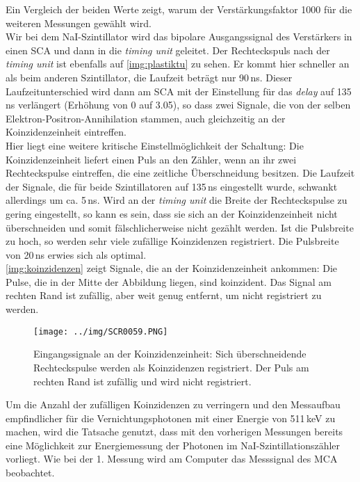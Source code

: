 Ein Vergleich der beiden Werte zeigt, warum der Verstärkungsfaktor 1000 für die weiteren Messungen gewählt wird.\\[\baselineskip]
Wir bei dem NaI-Szintillator wird das bipolare Ausgangssignal des Verstärkers in einen SCA
und dann in die \emph{timing unit} geleitet.
Der Rechteckspuls nach der \emph{timing unit} ist ebenfalls auf \autoref{img:plastiktu} zu sehen.
Er kommt hier schneller an als beim anderen Szintillator, 
die Laufzeit beträgt nur 90\,ns. Dieser Laufzeitunterschied wird dann am SCA mit der
Einstellung für das \emph{delay} auf 135\,ns verlängert (Erhöhung von 0 auf 3.05),
so dass zwei Signale, die von der selben
Elektron-Positron-Annihilation stammen, auch gleichzeitig an der Koinzidenzeinheit eintreffen.\\
Hier liegt eine weitere kritische Einstellmöglichkeit der Schaltung:
Die Koinzidenzeinheit liefert einen Puls an den Zähler, wenn an ihr zwei Rechteckspulse eintreffen,
die eine zeitliche Überschneidung besitzen.
Die Laufzeit der Signale, die für beide Szintillatoren auf 135\,ns eingestellt wurde,
schwankt allerdings um ca. 5\,ns. Wird an der \emph{timing unit}
die Breite der Rechteckspulse zu gering eingestellt, so
kann es sein, dass sie sich an der Koinzidenzeinheit nicht überschneiden und somit fälschlicherweise nicht
gezählt werden. Ist die Pulsbreite zu hoch, so werden sehr viele zufällige Koinzidenzen registriert.
Die Pulsbreite von 20\,ns erwies sich als optimal.\\
\autoref{img:koinzidenzen} zeigt Signale, die an der Koinzidenzeinheit ankommen:
Die Pulse, die in der Mitte der Abbildung liegen, sind koinzident.
Das Signal am rechten Rand ist zufällig, aber weit genug entfernt, um nicht registriert zu werden.
\begin{figure}[H]
\begin{center}
  \texttt{[image: ../img/SCR0059.PNG]}
  \caption{Eingangssignale an der Koinzidenzeinheit: Sich überschneidende Rechteckspulse werden als 
  Koinzidenzen registriert. Der Puls am rechten Rand ist zufällig und wird nicht registriert.}
  \label{img:koinzidenzen}
\end{center}
\end{figure}
Um die Anzahl der zufälligen Koinzidenzen zu verringern
und den Messaufbau empfindlicher für die Vernichtungsphotonen mit einer Energie von 511\,keV zu machen,
wird die Tatsache genutzt, dass mit den vorherigen Messungen bereits eine Möglichkeit zur
Energiemessung der Photonen im NaI-Szintillationszähler vorliegt.
Wie bei der 1. Messung wird am Computer das Messsignal des MCA beobachtet.
